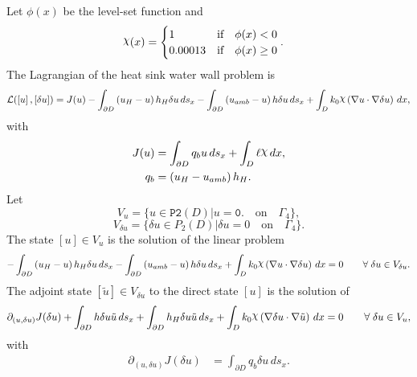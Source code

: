 \documentclass[preview]{standalone}
\let\oldcdot\cdot
\let\cdot\oldcdot
\begin{document}
Let $\phi(x)$ be the level-set function and
 \begin{align*}\raisebox{\depth}{$\chi$}(x) &= \begin{cases} 1 & \mbox{if}\quad \phi(x) < 0 \\ 0.00013 & \mbox{if}\quad \phi(x)  \ge 0 \end{cases}.\end{align*}
The Lagrangian of the heat sink water wall problem is
\begin{dmath*}
\mathcal L(\left[ u\right],\left[ \delta u\right]) = J(u) -  \int_{\partial D} \left(u_{H} - u\right) h_{H} \delta u \,ds_x -  \int_{\partial D} \left(u_{amb} - u\right) h \delta u \,ds_x +  \int_{D} k_{0} \raisebox{\depth}{$\chi$} \left(  \nabla u  \cdot  \nabla \delta u  \right) \,dx , 
\end{dmath*}
with 
\begin{align*}
J(u) &=  \int_{\partial D} q_{b} u \,ds_x +  \int_{D} \ell \raisebox{\depth}{$\chi$} \,dx,\\
q_{b} &= \left(u_{H} - u_{amb}\right) h_{H}.
 \end{align*}
Let
\begin{equation*}
V_{u} = \{ u \in \mathtt{\text{P2}}(D)| u = \mathtt{\text{0.}}  \quad \text{{on}} \quad\Gamma_{4} \},\end{equation*}
\begin{equation*}
V_{\delta u} = \{ \delta u \in P_{2}(D)| \delta u = 0  \quad \text{{on}} \quad\Gamma_{4} \}.\end{equation*}
The state $\left[ u\right] \in  V_{u}$ is the solution of the linear problem
\begin{dmath*}
-  \int_{\partial D} \left(u_{H} - u\right) h_{H} \delta u \,ds_x -  \int_{\partial D} \left(u_{amb} - u\right) h \delta u \,ds_x +  \int_{D} k_{0} \raisebox{\depth}{$\chi$} \left(  \nabla u  \cdot  \nabla \delta u  \right) \,dx = 0\qquad \forall\; {\delta u\in V_{\delta u}} . 
\end{dmath*}
The adjoint state $\left[ \tilde u\right] \in  V_{\delta u}$ to the direct state $\left[ u\right]$ is the solution of
\begin{dmath*}
\partial_{(u,\delta u)} J(\delta u) +  \int_{\partial D} h \delta u \tilde u \,ds_x +  \int_{\partial D} h_{H} \delta u \tilde u \,ds_x +  \int_{D} k_{0} \raisebox{\depth}{$\chi$} \left(  \nabla \delta u  \cdot  \nabla \tilde u  \right) \,dx = 0\qquad \forall\; {\delta u\in V_{u}} , 
\end{dmath*}
with 
\begin{align*}
\partial_{(u,\delta u)} J(\delta u) &=  \int_{\partial D} q_{b} \delta u \,ds_x.
 \end{align*}
\end{document}
